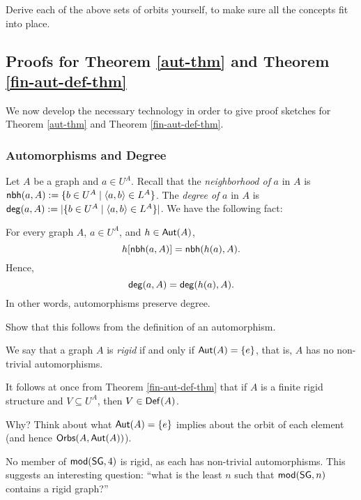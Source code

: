 \begin{aside}
    Derive each of the above sets of orbits yourself, to make sure all the concepts fit into place. 
\end{aside}
\newpage
\iffalse
\subsection*{Proofs for Theorem \ref{aut-thm} and Theorem \ref{fin-aut-def-thm}}
We now develop the necessary technology in order to give proof sketches for Theorem \ref{aut-thm} and Theorem \ref{fin-aut-def-thm}.  

\subsubsection*{Automorphisms and Degree}
Let $A$ be a graph and $a\in U^A$. Recall that the \emph{neighborhood of} $a$ in $A$ is $\mbox{$\mathsf{nbh}(a,A)$} := \{b\in U^A\mid\mbox{$\langle a,b \rangle$}\in L^A\}$. The \emph{degree of} $a$ in $A$ is $\mbox{$\mathsf{deg}(a,A)$} := \mbox{$|\{b\in U^A\mid\mbox{$\langle a,b \rangle$}\in L^A\}|$}$. We have the following fact:
\begin{proposition}
For every graph $A$, $a\in U^A$, and $h\in\mbox{$\mathsf{Aut}(A)$}$,
\[
h[\mbox{$\mathsf{nbh}(a,A)$}]=\mbox{$\mathsf{nbh}(h(a),A)$}.
\]
Hence,
\[
\mbox{$\mathsf{deg}(a,A)$} = \mbox{$\mathsf{deg}(h(a),A)$}. 
\]
In other words, automorphisms preserve degree. 
\end{proposition}

\begin{aside}
    Show that this follows from the definition of an automorphism.
\end{aside}

\begin{definition}
    We say that a graph $A$ is \emph{rigid} if and only if $\mbox{$\mathsf{Aut}(A)$}=\{e\}$, that is, $A$ has no non-trivial automorphisms.
\end{definition}

It follows at once from Theorem \ref{fin-aut-def-thm} that if $A$ is a finite rigid structure and $V\subseteq U^A$, then $V\in\mbox{$\mathsf{Def}(A)$}$.

\begin{aside}
    Why? Think about what $\mbox{$\mathsf{Aut}(A)$}=\{e\}$ implies about the orbit of each element (and hence $\mbox{$\mathsf{Orbs}(A,\mbox{$\mathsf{Aut}(A)$})$}$). 
\end{aside}

\begin{aside}
    No member of $\mbox{$\mathsf{mod}(\mbox{$\mathsf{SG}$},4)$}$ is rigid, as each has non-trivial automorphisms. This suggests an interesting question: ``what is the least $n$ such that $\mbox{$\mathsf{mod}(\mbox{$\mathsf{SG}$},n)$}$ contains a rigid graph?''
\end{aside}

